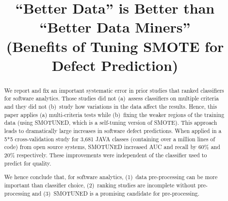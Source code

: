 \documentclass[10pt,conference]{IEEEtran}
\theoremstyle{break}
\theoremstyle{break}
\newcommand{\sma}{{\sc SMOTE}}
\newcommand{\smb}{{\sc SMOTUNED}}
\begin{document}
\pagestyle{plain}

\title{``Better Data'' is Better than ``Better Data Miners''\\ (Benefits of Tuning SMOTE for Defect Prediction) }



\author{
\and
{}
}

\maketitle

\begin{abstract}
We report and fix an important systematic error in prior
studies that ranked classifiers for software analytics.
Those studies  did  not (a)~assess classifiers on multiple   criteria
and they did not 
(b)~study  how variations in the  data affect the results. 
Hence, 
this paper applies (a)  multi-criteria tests while (b)~fixing the weaker regions of the training
 data (using {\smb}, which is a self-tuning version of {\sma}).
This approach
leads to dramatically large increases in software defect predictions.
When applied in a 5*5 cross-validation study for  3,681	JAVA classes (containing over a million lines of code) from open source  systems,
{\smb} increased
AUC and recall by 60\% and 20\% respectively. 
These improvements were independent of the classifier used to
predict for quality.

We hence conclude that, for  software analytics, (1)~data
pre-processing can be more important than  classifier
choice,
(2)~ranking studies  are  incomplete  without
 pre-processing and
(3)~{\smb} is a   promising candidate for  pre-processing.

\end{abstract}
\end{document}
